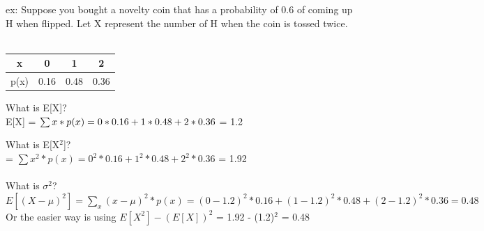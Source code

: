 \documentclass[12pt, a4paper]{article}
\begin{document}
	\noindent ex: Suppose you bought a novelty coin that has a probability of 0.6 of coming up H when flipped. Let X represent the number of H when the coin is tossed twice. \\~\\
	\begin{minipage}[c]{7cm}
		\begin{tabular}{ |c|c|c|c| } 
			\hline x & 0 & 1 & 2 \\ 
			\hline p(x) & 0.16 & 0.48 & 0.36 \\ 
			\hline
		\end{tabular}
	\end{minipage}
	\begin{minipage}[c]{7cm}
		What is E[X]? \\
		E[X] = $\sum x*p(x) \\ = 0*0.16 + 1*0.48 + 2*0.36$ = 1.2 \\
	\end{minipage}

	\noindent What is E[X$^2$]? \\
	= $\sum x^2*p(x) = 0^2*0.16 + 1^2*0.48 + 2^2*0.36$ = 1.92 \\~\\
	What is $\sigma^2$? \\
	$E[(X - \mu)^2] = \sum_{x}(x-\mu)^2*p(x) = (0-1.2)^2*0.16 + (1-1.2)^2*0.48 + (2-1.2)^2*0.36 = 0.48$ \\
	Or the easier way is using $E[X^2] - (E[X])^2$ = 1.92 - (1.2)$^2$ = 0.48 \\~\\
	
\end{document}

